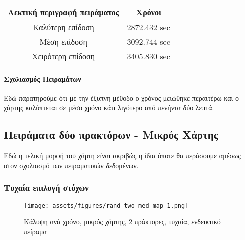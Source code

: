 \begingroup
\centering
\begin{tabular}{c | c }
	\textbf{Λεκτική περιγραφή πειράματος} & \textbf{Χρόνοι}\\ \hline{}
	Καλύτερη επίδοση & 2872.432 sec \\ \hline
	Μέση επίδοση & 3092.744 sec   \\ \hline
	Χειρότερη επίδοση & 3405.830 sec \\
\end{tabular}
\endgroup


\paragraph{Σχολιασμός Πειραμάτων}

Εδώ παρατηρούμε ότι με την έξυπνη μέθοδο ο χρόνος μειώθηκε περαιτέρω και ο χάρτης καλύπτεται σε μέσο χρόνο κάτι λιγότερο από πενήντα δύο λεπτά.

\newpage

\subsection{Πειράματα δύο πρακτόρων - Μικρός Χάρτης}

Εδώ η τελική μορφή του χάρτη είναι ακριβώς η ίδια όποτε θα περάσουμε αμέσως στον σχολιασμό των πειραματικών δεδομένων. 

\subsubsection{Τυχαία επιλογή στόχων}

\begin{figure}[!h]	
	\texttt{[image: assets/figures/rand-two-med-map-1.png]}
	\caption{Κάλυψη ανά χρόνο, μικρός χάρτης, 2 πράκτορες, τυχαία, ενδεικτικό πείραμα }
\end{figure}


